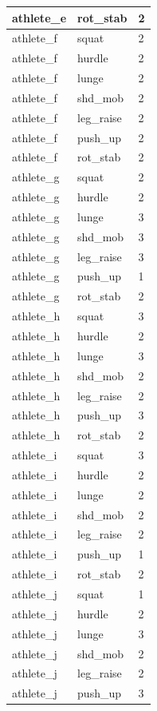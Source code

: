 \documentclass[
]{book}
\begin{document}
\begin{tabular}{l|l|l}
\hline
athlete\_e & rot\_stab & 2\\
\hline
athlete\_f & squat & 2\\
\hline
athlete\_f & hurdle & 2\\
\hline
athlete\_f & lunge & 2\\
\hline
athlete\_f & shd\_mob & 2\\
\hline
athlete\_f & leg\_raise & 2\\
\hline
athlete\_f & push\_up & 2\\
\hline
athlete\_f & rot\_stab & 2\\
\hline
athlete\_g & squat & 2\\
\hline
athlete\_g & hurdle & 2\\
\hline
athlete\_g & lunge & 3\\
\hline
athlete\_g & shd\_mob & 3\\
\hline
athlete\_g & leg\_raise & 3\\
\hline
athlete\_g & push\_up & 1\\
\hline
athlete\_g & rot\_stab & 2\\
\hline
athlete\_h & squat & 3\\
\hline
athlete\_h & hurdle & 2\\
\hline
athlete\_h & lunge & 3\\
\hline
athlete\_h & shd\_mob & 2\\
\hline
athlete\_h & leg\_raise & 2\\
\hline
athlete\_h & push\_up & 3\\
\hline
athlete\_h & rot\_stab & 2\\
\hline
athlete\_i & squat & 3\\
\hline
athlete\_i & hurdle & 2\\
\hline
athlete\_i & lunge & 2\\
\hline
athlete\_i & shd\_mob & 2\\
\hline
athlete\_i & leg\_raise & 2\\
\hline
athlete\_i & push\_up & 1\\
\hline
athlete\_i & rot\_stab & 2\\
\hline
athlete\_j & squat & 1\\
\hline
athlete\_j & hurdle & 2\\
\hline
athlete\_j & lunge & 3\\
\hline
athlete\_j & shd\_mob & 2\\
\hline
athlete\_j & leg\_raise & 2\\
\hline
athlete\_j & push\_up & 3\\

\end{tabular}
\end{document}
